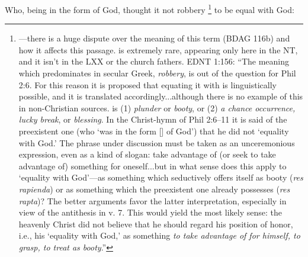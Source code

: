 			Who, being in the form of God, thought it not robbery%
				\footnote{%
					---there is a huge dispute over the meaning of this term (BDAG 116b) and how it affects this passage.  is extremely rare, appearing only here in the NT, and it isn't in the LXX or the church fathers. EDNT 1:156: ``The meaning which predominates in secular Greek, \textit{robbery}, is out of the question for Phil 2:6. For this reason it is proposed that equating it with  is linguistically possible, and it is translated accordingly...although there is no example of this in non-Christian sources.  is (1) \textit{plunder} or \textit{booty}, or (2) \textit{a chance occurrence, lucky break}, or \textit{blessing}. In the Christ-hymn of Phil 2:6--11 it is said of the preexistent one (who `was in the form [] of God') that he did not  `equality with God.' The phrase under discussion must be taken as an unceremonious expression, even as a kind of slogan: take advantage of (or seek to take advantage of) something for oneself...but in what sense does this apply to `equality with God'---as something which seductively offers itself as booty (\textit{res rapienda}) or as something which the preexistent one already possesses (\textit{res rapta})? The better arguments favor the latter interpretation, especially in view of the antithesis in v. 7. This would yield the most likely sense: the heavenly Christ did not believe that he should regard his position of honor, i.e., his `equality with God,' as something \textit{to take advantage of for himself, to grasp, to treat as booty}.''
					}
			to be equal with God:

			\begin{framed}
			\scriptsize
				\begin{compactdesc}
					\item[SBLG] 
				\end{compactdesc}
			\end{framed}

